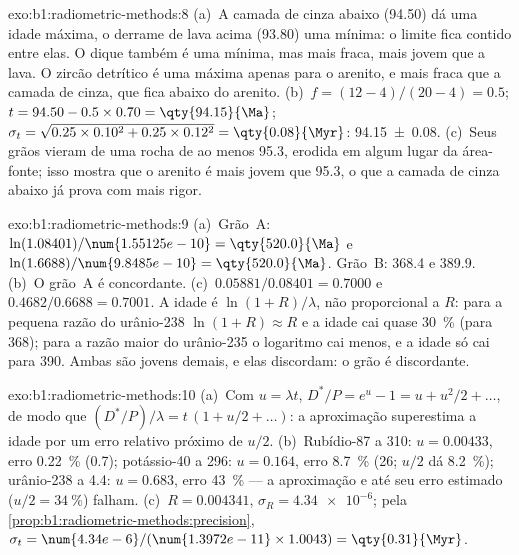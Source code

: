 \begin{solution}{exo:b1:radiometric-methods:8}
(a)~A camada de cinza abaixo (\qty{94.50}{\Ma}) dá uma idade máxima, o derrame de lava acima
(\qty{93.80}{\Ma}) uma mínima: o limite fica contido entre elas. O dique também é uma mínima,
mas mais fraca, mais jovem que a lava. O zircão detrítico é uma máxima apenas para o arenito, e
mais fraca que a camada de cinza, que fica abaixo do arenito. (b)~$f = (12 - 4)/(20 - 4) = 0.5$;
$t = 94.50 - 0.5 \times 0.70 =
\qty{94.15}{\Ma}$; $\sigma_t = \sqrt{0.25 \times 0.10^2 + 0.25 \times 0.12^2} =
\qty{0.08}{\Myr}$: \qty[uncertainty-mode=separate]{94.15(8)}{\Ma}. (c)~Seus
grãos vieram de uma rocha de ao menos \qty{95.3}{\Ma}, erodida em algum lugar da área-fonte; isso
mostra que o arenito é mais jovem que \qty{95.3}{\Ma}, o que a camada de cinza abaixo já prova
com mais rigor.
\end{solution}

\begin{solution}{exo:b1:radiometric-methods:9}
(a)~Grão~A: $\ln(1.08401)/\num{1.55125e-10} = \qty{520.0}{\Ma}$ e
$\ln(1.6688)/\num{9.8485e-10} = \qty{520.0}{\Ma}$. Grão~B: \qty{368.4}{\Ma} e
\qty{389.9}{\Ma}. (b)~O grão~A é concordante. (c)~$0.05881/0.08401 = 0.7000$ e
$0.4682/0.6688 = 0.7001$. A idade é $\ln(1 + R)/\lambda$, não proporcional a $R$: para a
pequena razão do urânio-238 $\ln(1+R) \approx R$ e a idade cai quase \qty{30}{\percent}
(para \qty{368}{\Ma}); para a razão maior do urânio-235 o logaritmo cai menos, e a idade só
cai para \qty{390}{\Ma}. Ambas são jovens demais, e elas discordam: o grão é discordante.
\end{solution}

\begin{solution}{exo:b1:radiometric-methods:10}
(a)~Com $u = \lambda t$, $D^*/P = e^u - 1 = u + u^2/2 + \dots$, de modo que $(D^*/P)/\lambda
= t\,(1 + u/2 + \dots)$: a aproximação superestima a idade por um erro relativo próximo de
$u/2$. (b)~Rubídio-87 a \qty{310}{\Ma}: $u = 0.00433$, erro \qty{0.22}{\percent}
(\qty{0.7}{\Myr}); potássio-40 a \qty{296}{\Ma}: $u =
0.164$, erro \qty{8.7}{\percent} (\qty{26}{\Myr}; $u/2$ dá \qty{8.2}{\percent});
urânio-238 a \qty{4.4}{\Ga}: $u = 0.683$, erro \qty{43}{\percent} --- a aproximação e até seu
erro estimado ($u/2 = \qty{34}{\percent}$) falham. (c)~$R = 0.004341$, $\sigma_R = \num{4.34e-6}$; pela \cref{prop:b1:radiometric-methods:precision}, $\sigma_t =
\num{4.34e-6}/(\num{1.3972e-11} \times 1.0043) = \qty{0.31}{\Myr}$.
\end{solution}

